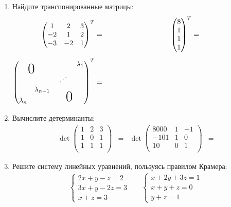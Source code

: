 \begin{enumerate}
\item Найдите транспонированные матрицы:
\begin{alignat*}{2}
    \begin{pmatrix}
        1 & 2 & 3\\
       -2 & 1 & 2\\
       -3 & -2 & 1\\
    \end{pmatrix}
    ^T&=
    & \hspace{3cm}
    \begin{pmatrix}
        8 \\
        1 \\
        1 \\
        1 \\
    \end{pmatrix}
    ^T &=\hspace{3cm} \\[0.5em]
    \begin{pmatrix}
           \     &               &                       & \lambda_1  \\
           \     & \shiftright{-30pt}{\raisebox{20pt}{\bigzero}}      & \reflectbox{$\ddots$} &  \\
           \     & \lambda_{n-1} & \raisebox{-7pt}{\shiftright{17pt}{\bigzero}}              &  \\
       \lambda_n &               &                       & 
    \end{pmatrix}
    ^T&= 
\end{alignat*}


\item Вычислите детерминанты:
\begin{align*}
    \det 
    \begin{pmatrix}
        1 & 2 & 3 \\
        1 & 0 & 1\\
        1 & 1 & 1\\
    \end{pmatrix}
    &= 
    &
    \det 
    \begin{pmatrix}
        8000 & 1 & -1 \\
        -101 & 1 & 0 \\
        10 & 0 & 1 \\
    \end{pmatrix}
    &=
\end{align*}


\item Решите систему линейных уравнений, пользуясь правилом Крамера:
\begin{align*}
    \begin{cases}
        2x + y - z = 2 \\
        3x + y -2z = 3 \\
        x + z = 3
    \end{cases}
    & & 
    \begin{cases}
        x + 2y + 3z = 1\\
        x + y + z = 0\\
        y + z = 1
    \end{cases}
\end{align*}



\end{enumerate}
